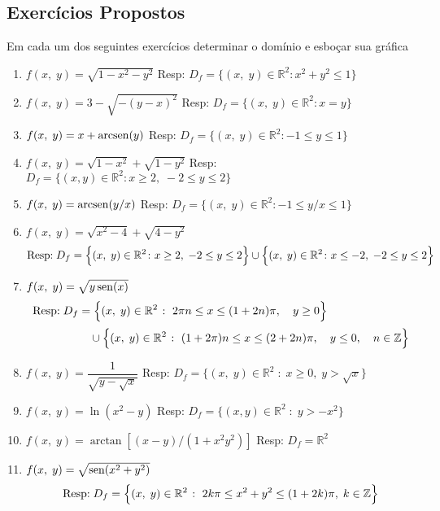 \subsection*{\textcolor[rgb]{0.98,0.00,0.00}{Exercícios Propostos}}
%
Em cada um dos seguintes exercícios determinar o domínio e esboçar sua gráfica
\begin{enumerate}
	\item $f(x, \; y)=\sqrt{1-x^2-y^2}$ \hfill Resp: $D_f=\{(x,\; y)\in \mathbb{R}^2\colon x^2+y^2\leq 1 \}$
	\item $f(x,\; y)=3-\sqrt{-(y-x)^2}$ \hfill Resp: $D_f=\{(x,\; y)\in \mathbb{R}^2\colon x=y \}$
	\item $f(x,\; y)=x+\operatorname{arcsen}(y)$ \hfill Resp: $D_f=\{(x,\; y)\in \mathbb{R}^2\colon -1\leq y\leq 1 \}$
	\item $f(x,\; y)=\sqrt{1-x^2}+\sqrt{1-y^2}$ \hfill Resp: $D_f=\{(x,y)\in \mathbb{R}^2\colon x\geq 2,\; -2\leq y\leq 2\}$
	\item $f(x,\; y)=\operatorname{arcsen}(y/x)$ \hfill Resp: $D_f=\{(x,\; y)\in \mathbb{R}^2\colon -1\leq y/x\leq 1 \}$
	\item $f(x,\; y)=\sqrt{x^2-4}+\sqrt{4-y^2}$ 
	\begin{equation*}
		\textrm{Resp:}\; D_f =\Bigl\{(x,\; y)\in \mathbb{R}^2\colon x\geq 2,\; -2\leq y\leq 2\Bigr\}\cup \Bigl\{(x, \; y)\in \mathbb{R}^2\colon x\leq -2,\; -2\leq y\leq 2 \Bigr\}
	\end{equation*}
	\item $f(x, \; y)=\sqrt{y\operatorname{sen}(x)}$
	\begin{align*}
		\textrm{Resp:}\;D_f&=\Bigl\{(x,\; y)\in \mathbb{R}^2 \; \colon\;  2\pi n\leq x \leq (1+2n)\pi,\quad y\geq 0 \Bigr\}\\[2pt]
		&\quad \cup \Bigl\{(x,\; y)\in \mathbb{R}^2 \; \colon\;  (1+2\pi)n\leq x \leq (2+2n)\pi,\quad  y\leq 0, \quad n\in \mathbb{Z}\Bigr\}
	\end{align*}
	\item $f(x,\; y)=\dfrac{1}{\sqrt{y-\sqrt{x}}}$ \hfill Resp: $D_f=\{(x,\; y)\in \mathbb{R}^2\; \colon\;  x\geq 0,\; y>\sqrt{x} \}$
	\item $f(x,\; y)=\ln(x^2-y)$ \hfill Resp: $D_f=\{(x,y)\in \mathbb{R}^2 \; \colon\;  y>-x^2 \}$
	\item $f(x,\; y)=\arctan[(x-y)/(1+x^2y^2)]$ \hfill Resp: $D_f=\mathbb{R}^2$
	\item $f(x,\; y)=\sqrt{\operatorname{sen}(x^2+y^2)}$
	\begin{equation*}
		\textrm{Resp:}\; D_f=\Bigl\{(x,\; y)\in \mathbb{R}^2\;  \colon\; 2k\pi\leq x^2+y^2\leq (1+2k)\pi,\; k\in \mathbb{Z}\Bigr\}
	\end{equation*}
\end{enumerate}